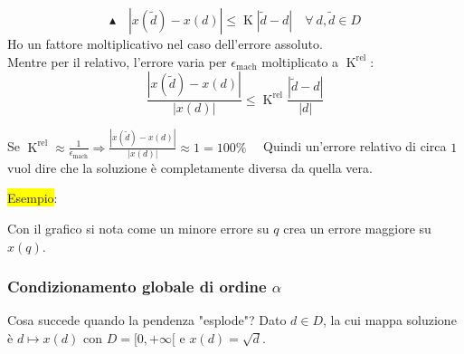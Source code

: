 \documentclass{article}
\begin{document}
$$\blacktriangle\quad \left|x(\widetilde{d})-x(d)\right|\le\operatorname{K}\left|\widetilde{d}-d\right|\quad \forall\ d,\widetilde{d}\in D$$
Ho un fattore moltiplicativo nel caso dell'errore assoluto.\\
Mentre per il relativo, l'errore varia per $\epsilon_{\mathrm{mach}}$ moltiplicato a $\operatorname{K}^{\mathrm{rel}}$:
\[\frac{\left|x(\widetilde{d})-x(d)\right|}{\left|x(d)\right|}\le\operatorname{K}^{\mathrm{rel}}\frac{\left|\widetilde{d}-d\right|}{|d|}\]

Se $\operatorname{K}^{\mathrm{rel}} \approx \frac{1}{\epsilon_{\mathrm{mach}}}\Rightarrow\frac{\left|x(\widetilde{d})-x(d)\right|}{\left|x(d)\right|}\approx 1=100\%\quad$
Quindi un'errore relativo di circa $1$ vuol dire che la soluzione è completamente diversa da quella vera.

\colorbox{yellow}{Esempio}:


Con il grafico si nota come un minore errore su $q$ crea un errore maggiore su $x(q)$.

\subsubsection{Condizionamento globale di ordine $\alpha$}
\begin{ex}{Cosa succede quando la pendenza "esplode"?}{}
    Dato $d\in D$, la cui mappa soluzione è $d\mapsto x(d)$ con $D=[0,+\infty[$ e $x(d)=\sqrt{d}$.
\end{ex}

\end{document}
